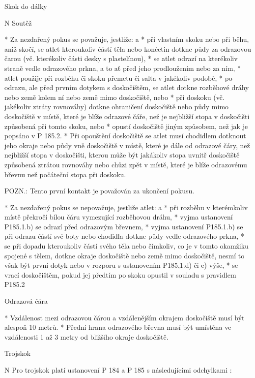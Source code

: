 \secc Skok do dálky

\begitems \style N
Soutěž

* Za nezdařený pokus se považuje, jestliže:
  \begitems \style a
  * při vlastním skoku nebo při běhu, aniž skočí, se atlet kteroukoliv částí těla nebo končetin dotkne půdy za odrazovou čarou (vč. kterékoliv části desky s plastelínou),
  * se atlet odrazí na kterékoliv straně vedle odrazového prkna, a to ať před jeho prodloužením nebo za ním,
  * atlet použije při rozběhu či skoku přemetu či salta v jakékoliv podobě,
  * po odrazu, ale před prvním dotykem s doskočištěm, se atlet dotkne rozběhové dráhy nebo země kolem ní nebo země mimo doskočiště, nebo
  * při doskoku (vč. jakékoliv ztráty rovnováhy) dotkne ohraničení doskočiště nebo půdy mimo doskočiště v místě, které je blíže odrazové čáře, než je nejbližší stopa v doskočišti způsobená při tomto skoku, nebo
  * opustí doskočiště jiným způsobem, než jak je popsáno v P 185.2.
  \enditems
* Při opouštění doskočiště se atlet musí chodidlem dotknout jeho okraje nebo půdy vně doskočiště v místě, které je dále od odrazové čáry, než nejbližší stopa v doskočišti, kterou může být jakákoliv stopa uvnitř doskočiště způsobená ztrátou rovnováhy nebo chůzi zpět v místě, které je blíže odrazovému břevnu než počáteční stopa při doskoku.

POZN.: Tento první kontakt je považován za ukončení pokusu.

* Za nezdařený pokus se nepovažuje, jestliže atlet:
  \begitems \style a
  * při rozběhu v kterémkoliv místě překročí bílou čáru vymezující rozběhovou dráhu,
  * vyjma ustanovení P185.1.b)  se odrazí před odrazovým břevnem,
  * vyjma ustanovení P185.1.b)  se při odrazu částí své boty nebo chodidla dotkne půdy vedle odrazového prkna,
  * se při dopadu kteroukoliv částí svého těla nebo čímkoliv, co je v tomto okamžiku spojené s tělem, dotkne okraje doskočiště nebo země mimo doskočiště, nesmí to však být první dotyk nebo v rozporu s ustanovením P185,1.d) či e) výše,
  * se vrací doskočištěm, pokud jej předtím po skoku opustil v souladu s pravidlem P185.2
  \enditems

Odrazová čára

* Vzdálenost mezi odrazovou čárou a vzdálenějším okrajem doskočiště musí být alespoň 10 metrů.
* Přední hrana odrazového břevna musí být umístěna ve vzdálenosti 1 až 3 metry od bližšího okraje doskočiště.
\enditems

\secc Trojskok

\begitems \style N
Pro trojskok platí ustanovení P 184 a P 185 s následujícími odchylkami :

